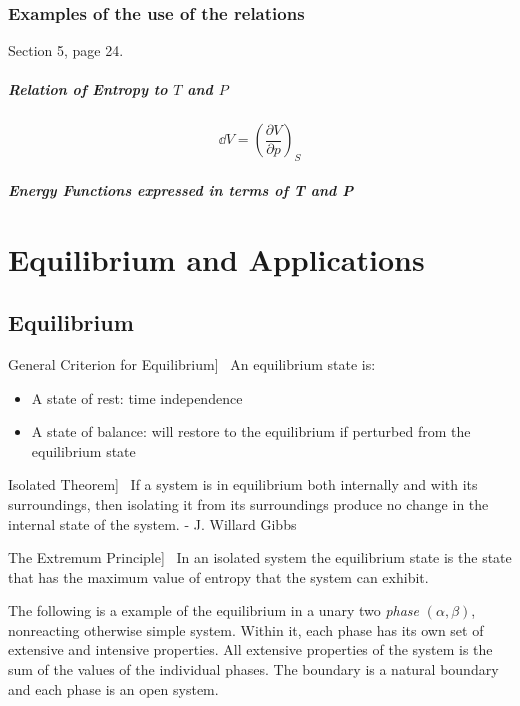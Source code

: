 \documentclass[UTF8]{book}
\newenvironment{theorem}[2][Theorem]{\begin{trivlist}
\item[\hskip \labelsep {\bfseries #1}\hskip \labelsep {\bfseries }]}{\end{trivlist}}
\begin{document}
\subsection{Examples of the use of the
relations}
Section 5, page 24.
\paragraph{Relation of Entropy to $T$ and $P$}
\[\dd{V}= \left(\dfrac{\partial V}{\partial p}\right)_S\]
\paragraph{Energy Functions expressed in terms of T and P}

\chapter{Equilibrium and Applications}
\section{Equilibrium}
\begin{theorem}
[General Criterion for Equilibrium]~  {An equilibrium state is:}
\begin{itemize}
\item  {A state of rest: time independence}
\item  {A state of balance: will restore to the equilibrium if perturbed from the equilibrium state}
\end{itemize}
\end{theorem}

\begin{theorem}
[Isolated Theorem]~  {If a system is in equilibrium both internally and with its surroundings, then isolating it from its surroundings produce no change in the internal state of the system. - J. Willard Gibbs}
\end{theorem}

\begin{theorem}
[The Extremum Principle]~  {In an isolated system the equilibrium state is the state that has the maximum value of entropy that the system can exhibit.}
\end{theorem}

 {The following is a example of the equilibrium in a unary two \emph{phase} $(\alpha , \beta)$, nonreacting otherwise simple system. Within it, each phase has its own set of extensive and intensive properties. All extensive properties of the system is the sum of the values of the individual phases. The boundary is a natural boundary and each phase is an open system.}
 
\end{document}
